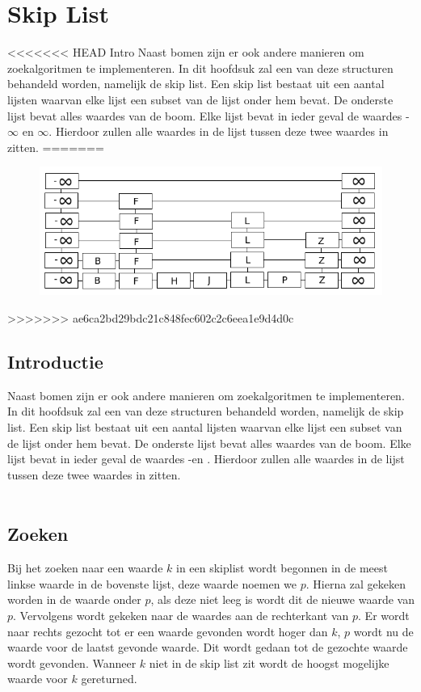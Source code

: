 \chapter{Skip List}
\label{sec:Hoofdstuk 6}

<<<<<<< HEAD
Intro
Naast bomen zijn er ook andere manieren om zoekalgoritmen te implementeren. In dit hoofdsuk zal een van deze structuren behandeld worden, namelijk de skip list. Een skip list bestaat uit een aantal lijsten waarvan elke lijst een subset van de lijst onder hem bevat. De onderste lijst bevat alles waardes van de boom. Elke lijst bevat in ieder geval de waardes -$\infty$ en $\infty$. Hierdoor zullen alle waardes in de lijst tussen deze twee waardes in zitten.
=======
\begin{figure}[h]
	\centering
		\includegraphics[width=\textwidth]{chap6/skiplist}
	\label{fig:skiplist}
\end{figure}
>>>>>>> ae6ca2bd29bdc21c848fec602c2c6eea1e9d4d0c

\section{Introductie}
Naast bomen zijn er ook andere manieren om zoekalgoritmen te implementeren. In dit hoofdsuk zal een van deze structuren behandeld worden, namelijk de skip list. Een skip list bestaat uit een aantal lijsten waarvan elke lijst een subset van de lijst onder hem bevat. De onderste lijst bevat alles waardes van de boom. Elke lijst bevat in ieder geval de waardes -\infty en \infty. Hierdoor zullen alle waardes in de lijst tussen deze twee waardes in zitten.\\
\\
\section{Zoeken}
Bij het zoeken naar een waarde $k$ in een skiplist wordt begonnen in de meest linkse waarde in de bovenste lijst, deze waarde noemen we $p$. Hierna zal gekeken worden in de waarde onder $p$, als deze niet leeg is wordt dit de nieuwe waarde van $p$. Vervolgens wordt gekeken naar de waardes aan de rechterkant van $p$. Er wordt naar rechts gezocht tot er een waarde gevonden wordt hoger dan $k$, $p$ wordt nu de waarde voor de laatst gevonde waarde. Dit wordt gedaan tot de gezochte waarde wordt gevonden. Wanneer $k$ niet in de skip list zit wordt de hoogst mogelijke waarde voor $k$ gereturned.\\
\\
